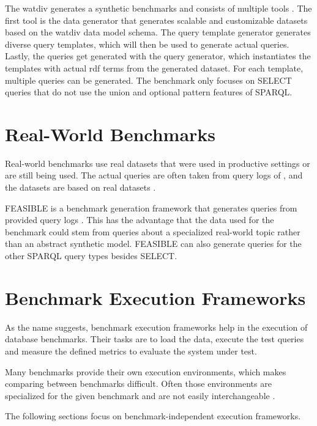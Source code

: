 The \ac{watdiv} generates a synthetic benchmarks and consists of multiple tools \cite{alucDiversifiedStressTesting2014}.
The first tool is the data generator that generates scalable and customizable datasets based on the \ac{watdiv} data model schema.
The query template generator generates diverse query templates, which will then be used to generate actual queries.
Lastly, the queries get generated with the query generator, which instantiates the templates with actual \ac{rdf} terms from the generated dataset.
For each template, multiple queries can be generated.
The benchmark only focuses on SELECT queries that do not use the union and optional pattern features of SPARQL.

\section{Real-World Benchmarks}
\label{sec:benchmarks_real_data}
Real-world benchmarks use real datasets that were used in productive settings or are still being used.
The actual queries are often taken from query logs of \tsp{}, and the datasets are based on real datasets \cite{morseyDBpediaSPARQLBenchmark2011, saleemFEASIBLEFeatureBasedSPARQL2015}.

FEASIBLE is a benchmark generation framework that generates queries from provided query logs \cite{saleemFEASIBLEFeatureBasedSPARQL2015}.
This has the advantage that the data used for the benchmark could stem from queries about a specialized real-world topic rather than an abstract synthetic model.
FEASIBLE can also generate queries for the other SPARQL query types besides SELECT.

\section{Benchmark Execution Frameworks}
\label{sec:benchmark_frameworks}
As the name suggests, benchmark execution frameworks help in the execution of database benchmarks.
Their tasks are to load the data, execute the test queries and measure the defined metrics to evaluate the system under test.

Many benchmarks provide their own execution environments, which makes comparing between benchmarks difficult.
Often those environments are specialized for the given benchmark and are not easily interchangeable \cite{conradsIguanaGenericFramework2017}.

The following sections focus on benchmark-independent execution frameworks.


